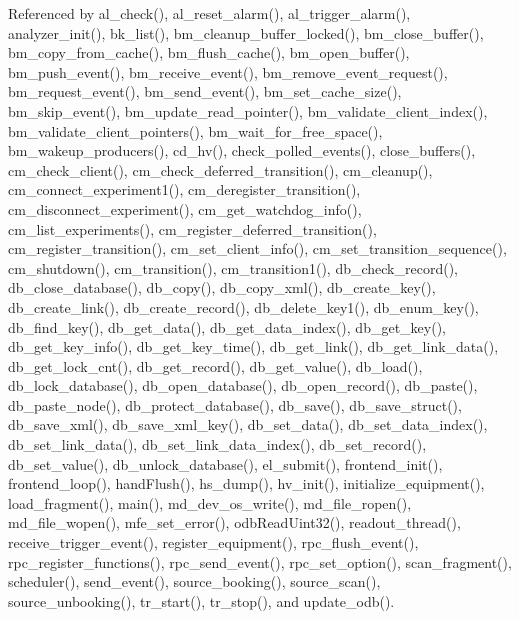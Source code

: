 Referenced by al\_\-check(), al\_\-reset\_\-alarm(), al\_\-trigger\_\-alarm(), analyzer\_\-init(), bk\_\-list(), bm\_\-cleanup\_\-buffer\_\-locked(), bm\_\-close\_\-buffer(), bm\_\-copy\_\-from\_\-cache(), bm\_\-flush\_\-cache(), bm\_\-open\_\-buffer(), bm\_\-push\_\-event(), bm\_\-receive\_\-event(), bm\_\-remove\_\-event\_\-request(), bm\_\-request\_\-event(), bm\_\-send\_\-event(), bm\_\-set\_\-cache\_\-size(), bm\_\-skip\_\-event(), bm\_\-update\_\-read\_\-pointer(), bm\_\-validate\_\-client\_\-index(), bm\_\-validate\_\-client\_\-pointers(), bm\_\-wait\_\-for\_\-free\_\-space(), bm\_\-wakeup\_\-producers(), cd\_\-hv(), check\_\-polled\_\-events(), close\_\-buffers(), cm\_\-check\_\-client(), cm\_\-check\_\-deferred\_\-transition(), cm\_\-cleanup(), cm\_\-connect\_\-experiment1(), cm\_\-deregister\_\-transition(), cm\_\-disconnect\_\-experiment(), cm\_\-get\_\-watchdog\_\-info(), cm\_\-list\_\-experiments(), cm\_\-register\_\-deferred\_\-transition(), cm\_\-register\_\-transition(), cm\_\-set\_\-client\_\-info(), cm\_\-set\_\-transition\_\-sequence(), cm\_\-shutdown(), cm\_\-transition(), cm\_\-transition1(), db\_\-check\_\-record(), db\_\-close\_\-database(), db\_\-copy(), db\_\-copy\_\-xml(), db\_\-create\_\-key(), db\_\-create\_\-link(), db\_\-create\_\-record(), db\_\-delete\_\-key1(), db\_\-enum\_\-key(), db\_\-find\_\-key(), db\_\-get\_\-data(), db\_\-get\_\-data\_\-index(), db\_\-get\_\-key(), db\_\-get\_\-key\_\-info(), db\_\-get\_\-key\_\-time(), db\_\-get\_\-link(), db\_\-get\_\-link\_\-data(), db\_\-get\_\-lock\_\-cnt(), db\_\-get\_\-record(), db\_\-get\_\-value(), db\_\-load(), db\_\-lock\_\-database(), db\_\-open\_\-database(), db\_\-open\_\-record(), db\_\-paste(), db\_\-paste\_\-node(), db\_\-protect\_\-database(), db\_\-save(), db\_\-save\_\-struct(), db\_\-save\_\-xml(), db\_\-save\_\-xml\_\-key(), db\_\-set\_\-data(), db\_\-set\_\-data\_\-index(), db\_\-set\_\-link\_\-data(), db\_\-set\_\-link\_\-data\_\-index(), db\_\-set\_\-record(), db\_\-set\_\-value(), db\_\-unlock\_\-database(), el\_\-submit(), frontend\_\-init(), frontend\_\-loop(), handFlush(), hs\_\-dump(), hv\_\-init(), initialize\_\-equipment(), load\_\-fragment(), main(), md\_\-dev\_\-os\_\-write(), md\_\-file\_\-ropen(), md\_\-file\_\-wopen(), mfe\_\-set\_\-error(), odbReadUint32(), readout\_\-thread(), receive\_\-trigger\_\-event(), register\_\-equipment(), rpc\_\-flush\_\-event(), rpc\_\-register\_\-functions(), rpc\_\-send\_\-event(), rpc\_\-set\_\-option(), scan\_\-fragment(), scheduler(), send\_\-event(), source\_\-booking(), source\_\-scan(), source\_\-unbooking(), tr\_\-start(), tr\_\-stop(), and update\_\-odb().
